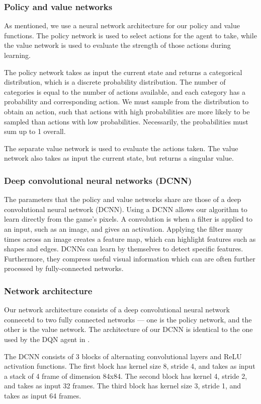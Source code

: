 \documentclass[12pt,a4paper]{article}
\begin{document}
\subsubsection{Policy and value networks}
As mentioned, we use a neural network architecture for our policy and value functions. The policy network is used to select actions for the agent to take, while the value network is used to evaluate the strength of those actions during learning. 

The policy network takes as input the current state and returns a categorical distribution, which is a discrete probability distribution. The number of categories is equal to the number of actions available, and each category has a probability and corresponding action. We must sample from the distribution to obtain an action, such that actions with high probabilities are more likely to be sampled than actions with low probabilities. Necessarily, the probabilities must sum up to 1 overall. 

The separate value network is used to evaluate the actions taken. The value network also takes as input the current state, but returns a singular value. 

\subsubsection{Deep convolutional neural networks (DCNN)}
The parameters that the policy and value networks share are those of a deep convolutional neural network (DCNN). Using a DCNN allows our algorithm to learn directly from the game's pixels. A convolution is when a filter is applied to an input, such as an image, and gives an activation. Applying the filter many times across an image creates a feature map, which can highlight features such as shapes and edges. DCNNs can learn by themselves to detect specific features. Furthermore, they compress useful visual information which can are often further processed by fully-connected networks.

\subsubsection{Network architecture}
Our network architecture consists of a deep convolutional neural network connecetd to two fully connected networks --- one is the policy network, and the other is the value network. The architecture of our DCNN is identical to the one used by the DQN agent in \cite{Mnih2015}.

The DCNN consists of 3 blocks of alternating convolutional layers and ReLU activation functions. The first block has kernel size 8, stride 4, and takes as input a stack of 4 frame of dimension 84x84. The second block has kernel 4, stride 2, and takes as input 32 frames. The third block has kernel size 3, stride 1, and takes as input 64 frames. 
\end{document}
